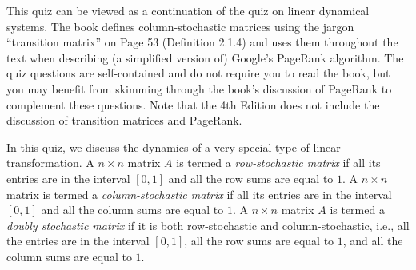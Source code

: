 \documentclass[10pt]{amsart}
\begin{document}
This quiz can be viewed as a continuation of the quiz on linear
dynamical systems. The book defines column-stochastic matrices using
the jargon ``transition matrix'' on Page 53 (Definition 2.1.4) and
uses them throughout the text when describing (a simplified version
of) Google's PageRank algorithm. The quiz questions are self-contained
and do not require you to read the book, but you may benefit from
skimming through the book's discussion of PageRank to complement these
questions. Note that the 4th Edition does not include the discussion
of transition matrices and PageRank.

In this quiz, we discuss the dynamics of a very special type of linear
transformation. A $n \times n$ matrix $A$ is termed a {\em
  row-stochastic matrix} if all its entries are in the interval
$[0,1]$ and all the row sums are equal to $1$. A $n \times n$ matrix
is termed a {\em column-stochastic matrix} if all its entries are in
the interval $[0,1]$ and all the column sums are equal to $1$. A $n
\times n$ matrix $A$ is termed a {\em doubly stochastic matrix} if it
is both row-stochastic and column-stochastic, i.e., all the entries
are in the interval $[0,1]$, all the row sums are equal to $1$, and
all the column sums are equal to $1$.
\end{document}
